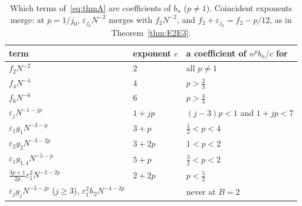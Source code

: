 \begin{table}[ht]
\centering
\small
\begin{tabular}{lll}
\toprule
term & exponent $e$ & a coefficient of $n^pb_n/c$ for\\
\midrule
$f_2N^{-2}$ & $2$ & all $p\ne1$\\
$f_4N^{-4}$ & $4$ & $p>\frac23$\\
$f_6N^{-6}$ & $6$ & $p>\frac43$\\
$\varepsilon_jN^{-1-jp}$ & $1+jp$ & $(j-3)p<1$ and $1+jp<7$\\
$\varepsilon_1g_1N^{-3-p}$ & $3+p$ & $\frac12<p<4$\\
$\varepsilon_2g_2N^{-3-2p}$ & $3+2p$ & $1<p<2$\\
$\varepsilon_1g_{1,4}N^{-5-p}$ & $5+p$ & $\frac32<p<2$\\
$\frac{3p+1}{2p}\varepsilon_1^2N^{-2-2p}$ & $2+2p$ & $p<\frac52$\\
$\varepsilon_jg_jN^{-3-jp}$ ($j\ge3$), $\varepsilon_1^2h_2N^{-4-2p}$ & & never at $B=2$\\
\bottomrule
\end{tabular}
\caption{Which terms of~\eqref{eq:thmA} are coefficients of $b_n$ ($p\ne1$). Coincident exponents merge: at $p=1/j_0$,
$\varepsilon_{j_0}N^{-2}$ merges with $f_2N^{-2}$, and $f_2+\varepsilon_{j_0}=f_2-p/12$, as in Theorem~\ref{thm:E2E3}.}
\label{tab:visible}
\end{table}

